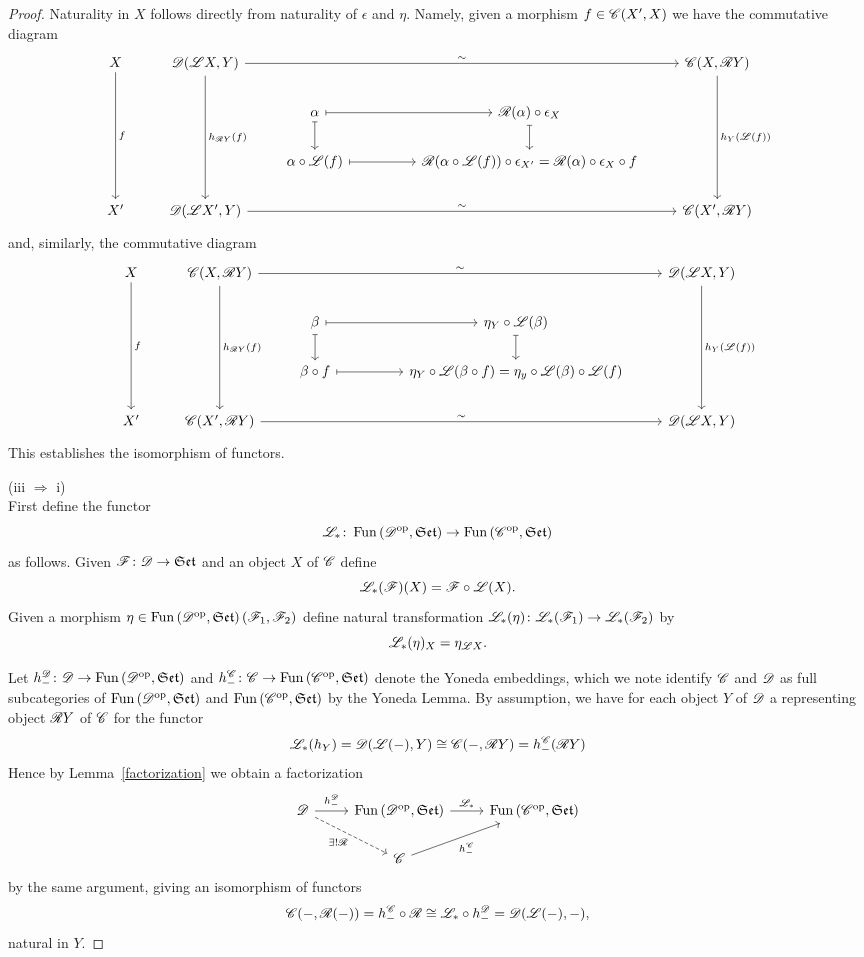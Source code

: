 \documentclass[10pt]{amsart}
\begin{document}
\begin{prop}
\begin{proof}
    Naturality in $X$ follows directly from naturality of $\epsilon$ and $\eta$.
    Namely, given a morphism $f \in \mathscr{C}(X^\prime, X)$ we have the commutative diagram
    $$\begin{tikzcd}
      X\arrow{ddd}{f} & \D(\LA X, Y) \arrow{rrrr}{\sim}\arrow{ddd}{h_{\RA Y}(f)}& & & & \C(X, \RA Y)\arrow{ddd}{h_{Y}(\LA(f))}\\
      & & \alpha \arrow[mapsto]{rr}\arrow[mapsto]{d}& & \RA(\alpha) \circ \epsilon_X\arrow[mapsto]{d}\\
      & & \alpha \circ \LA(f) \arrow[mapsto]{rr} & & \RA(\alpha \circ \LA(f)) \circ \epsilon_{X^\prime} = \RA(\alpha) \circ \epsilon_X \circ f\\
      X^\prime & \D(\LA X^\prime, Y) \arrow{rrrr}{\sim} & & & & \C(X^\prime, \RA Y)
    \end{tikzcd}$$
    and, similarly, the commutative diagram
    $$\begin{tikzcd}
      X\arrow{ddd}{f} & \C(X, \RA Y) \arrow{rrrr}{\sim}\arrow{ddd}{h_{\RA Y}(f)}& & & & \D(\LA X, Y)\arrow{ddd}{h_{Y}(\LA(f))}\\
      & & \beta \arrow[mapsto]{rr}\arrow[mapsto]{d}& & \eta_Y \circ \LA(\beta)\arrow[mapsto]{d}\\
      & & \beta \circ f \arrow[mapsto]{rr} & & \eta_Y \circ \LA(\beta \circ f) = \eta_y \circ \LA(\beta) \circ \LA(f)\\
      X^\prime & \C(X^\prime, \RA Y) \arrow{rrrr}{\sim} & & & & \D(\LA X, Y)
    \end{tikzcd}$$
    This establishes the isomorphism of functors.
    
    
    (iii $\Rightarrow$ i)\\
    First define the functor
    $$\mathscr{L}_\ast \colon \operatorname{Fun}\left(\mathscr{D}^\text{op}, \mathfrak{Set}\right) \to \operatorname{Fun}\left(\mathscr{C}^\text{op}, \mathfrak{Set}\right)$$
    as follows.
    Given $\mathscr{F} \colon \mathscr{D} \to \mathfrak{Set}$ and an object $X$ of $\mathscr{C}$ define
    $$\mathscr{L}_\ast(\mathscr{F})(X) = \mathscr{F} \circ \mathscr{L}(X).$$
    Given a morphism $\eta \in \operatorname{Fun}\left(\mathscr{D}^\text{op}, \mathfrak{Set}\right)(\mathscr{F}_1, \mathscr{F}_2)$ define natural transformation
    $\mathscr{L}_\ast(\eta) \colon \mathscr{L}_\ast(\mathscr{F}_1) \to \mathscr{L}_\ast(\mathscr{F}_2)$ by
    $$\mathscr{L}_\ast(\eta)_X = \eta_{\mathscr{L} X}.$$
    
    Let $h_-^{\mathscr{D}} \colon \mathscr{D} \to \operatorname{Fun}\left(\mathscr{D}^\text{op}, \mathfrak{Set}\right)$ and $h_-^{\mathscr{C}} \colon \mathscr{C} \to \operatorname{Fun}\left(\mathscr{C}^\text{op}, \mathfrak{Set}\right)$ denote the Yoneda embeddings, which we note identify $\mathscr{C}$ and $\mathscr{D}$ as full subcategories of $\operatorname{Fun}\left(\mathscr{D}^\text{op}, \mathfrak{Set}\right)$ and $\operatorname{Fun}\left(\mathscr{C}^\text{op}, \mathfrak{Set}\right)$ by the Yoneda Lemma.
    By assumption, we have for each object $Y$ of $\mathscr{D}$ a representing object $\mathscr{R} Y$ of $\mathscr{C}$ for the functor 
    $$\mathscr{L}_\ast(h_Y) = \mathscr{D}(\mathscr{L}( - ), Y) \cong \mathscr{C}(-, \mathscr{R} Y) = h_-^{\mathscr{C}}(\mathscr{R} Y)$$
    Hence by Lemma~\ref{factorization} we obtain a factorization
    $$\begin{tikzcd}
      \D \arrow{r}{h_-^{\D}}\arrow[dashed,swap]{rd}{\exists ! \RA} & \Fun{\D^\text{op}}{\Sets} \arrow{r}{\LA_\ast} & \Fun{\C^\text{op}}{\Sets}\\
      & \C \arrow[swap]{ur}{h_-^{\C}}
    \end{tikzcd}$$
    by the same argument, giving an isomorphism of functors
    $$\mathscr{C}(-, \mathscr{R}( - )) = h_-^{\mathscr{C}} \circ \mathscr{R} \cong \mathscr{L}_\ast \circ h_-^{\mathscr{D}} = \mathscr{D}(\mathscr{L}( - ), -),$$
    natural in $Y$.
    

\end{proof}
\end{prop}
\end{document}
